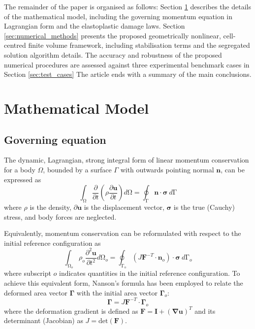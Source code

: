 \documentclass[sn-mathphys,Numbered,draft]{sn-jnl}%
\begin{document}
The remainder of the paper is organised as follows:
Section \ref{sec:math_model} describes the details of the mathematical model, including the governing momentum equation in Lagrangian form and the elastoplastic damage laws.
Section \ref{sec:numerical_methods} presents the proposed geometrically nonlinear, cell-centred finite volume framework, including stabilisation terms and the segregated solution algorithm details.
The accuracy and robustness of the proposed numerical procedures are assessed against three experimental benchmark cases in Section \ref{sec:test_cases}
The article ends with a summary of the main conclusions.


\section{Mathematical Model}\label{sec:math_model}

\subsection{Governing equation}

The dynamic, Lagrangian, strong integral form of linear momentum conservation for a body $\Omega$, bounded by a surface $\Gamma$ with outwards pointing normal $\textbf{n}$, can be expressed as
\begin{equation} \label{eqn:strongIntegralMomentum}
    \int_{\mathrm{\Omega}} \frac{\partial }{\partial t} \left( \rho \frac{\partial \mathbf{u} }{\partial t} \right) d\mathrm{\Omega}
    =
    \oint_{\mathrm{\Gamma}}{\mathbf{n}\cdot\boldsymbol{\sigma}}\ d\mathrm{\Gamma}
\end{equation}
where $\rho$ is the density, $\partial \mathbf{u}$ is the displacement vector, $\boldsymbol{\sigma}$ is the true (Cauchy) stress, and body forces are neglected.

Equivalently, momentum conservation can be reformulated with respect to the initial reference configuration as
\begin{equation}
    \int_{\mathrm{\Omega}_o} \rho_o \frac{\partial^2 \mathbf{u} }{\partial t^2} d\mathrm{\Omega}_o
    =
    \oint_{\mathrm{\Gamma_o}} \left( J \mathbf{F}^{-T} \cdot \mathbf{n}_o \right) \cdot \boldsymbol{\sigma} \ d\mathrm{\Gamma}_o
\end{equation}
where subscript $o$ indicates quantities in the initial reference configuration.
To achieve this equivalent form, Nanson’s formula \cite{bathe_finite_1996} has been employed to relate the deformed area vector $\mathbf{\Gamma}$ with the initial area vector $\mathbf{\Gamma}_{o}$:
\begin{equation}
    \mathbf{\Gamma} = J\mathbf{F}^{-T}\cdot\mathbf{\Gamma}_o
\end{equation}
where the deformation gradient is defined as $\mathbf{F} = \textbf{I} + (\boldsymbol{\nabla} \boldsymbol{u})^T$ and its determinant (Jacobian) as $J = \text{det}(\boldsymbol{F})$.
\end{document}

